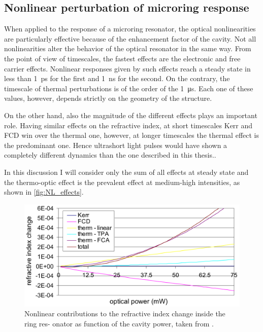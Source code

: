 \subsection{Nonlinear perturbation of microring response}
\label{ssec:Nonlinear_perturbation_of_microring_response}
When applied to the response of a microring resonator, the optical nonlinearities are particularly effective because of the enhancement factor of the cavity.
Not all nonlinearities alter the behavior of the optical resonator in the same way.
From the point of view of timescales, the fastest effects are the electronic and free carrier effects.
Nonlinear responses given by such effects reach a steady state in less than \SI{1}{\ps} for the first and \SI{1}{\ns} for the second.
On the contrary, the timescale of thermal perturbations is of the order of the \SI{1}{\us}.
Each one of these values, however, depends strictly on the geometry of the structure.

On the other hand, also the magnitude of the different effects plays an important role.
Having similar effects on the refractive index, at short timescales Kerr and FCD win over the thermal one, however, at longer timescales the thermal effect is the predominant one.
Hence ultrashort light pulses would have shown a completely different dynamics than the one described in this thesis..

In this discussion I will consider only the sum of all effects at steady state and the thermo-optic effect is the prevalent effect at medium-high intensities, as shown in \autoref{fig:NL_effects}.

\begin{figure}[!htbp]
	\centering
	\includegraphics[scale=.4]{figures/Baets_NL_dependence_400.png}
	\caption{Nonlinear contributions to the refractive index change inside the ring res-
onator as function of the cavity power, taken from \cite{priem2005optical}.}
	\label{fig:NL_effects}
\end{figure}

